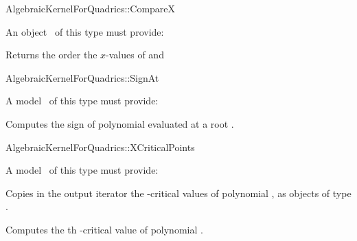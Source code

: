 
\begin{ccRefFunctionObjectConcept}{AlgebraicKernelForQuadrics::CompareX}


An object \ccVar\ of this type must provide:

{Returns the order the $x$-values of  and }

\end{ccRefFunctionObjectConcept}


\begin{ccRefFunctionObjectConcept}{AlgebraicKernelForQuadrics::SignAt}

\ccDefinition


A model \ccVar\ of this type must provide:

{Computes the sign of polynomial  evaluated at a root .}

\end{ccRefFunctionObjectConcept}


\begin{ccRefFunctionObjectConcept}{AlgebraicKernelForQuadrics::XCriticalPoints}


A model \ccVar\ of this type must provide:

{Copies in the output iterator the -critical values of polynomial 
, as objects of type .} 

{Computes the th -critical value of polynomial .} 

\end{ccRefFunctionObjectConcept}

